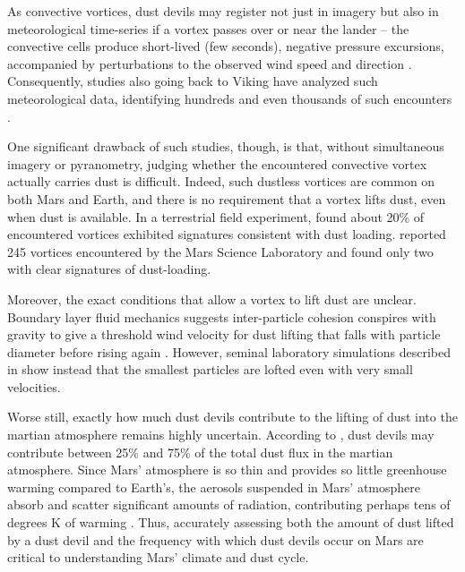 \documentclass{aastex63}
\begin{document}
As convective vortices, dust devils may register not just in imagery but also in meteorological time-series if a vortex passes over or near the lander -- the convective cells produce short-lived (few seconds), negative pressure excursions, accompanied by perturbations to the observed wind speed and direction \citep{2016Icar..271..326L}. Consequently, studies also going back to Viking have analyzed such meteorological data, identifying hundreds and even thousands of such encounters \citep{2003Icar..163...78R, 1999GeoRL..26.2781M, 1983JGR....8811005R, 2003JGRE..108.5133F, 2002GeoRL..29.2103M, 2016SSRv..203..277L}.

One significant drawback of such studies, though, is that, without simultaneous imagery or pyranometry, judging whether the encountered convective vortex actually carries dust is difficult. Indeed, such dustless vortices are common on both Mars and Earth, and there is no requirement that a vortex lifts dust, even when dust is available. In a terrestrial field experiment, \citet{LORENZ20151} found about 20\% of encountered vortices exhibited signatures consistent with dust loading. \citet{2016Icar..278..180S} reported 245 vortices encountered by the Mars Science Laboratory and found only two with clear signatures of dust-loading. 

Moreover, the exact conditions that allow a vortex to lift dust are unclear. Boundary layer fluid mechanics suggests inter-particle cohesion conspires with gravity to give a threshold wind velocity for dust lifting that falls with particle diameter before rising again \citep{1985wagp.book.....G}. However, seminal laboratory simulations described in \citet{2010Icar..206..306N} show instead that the smallest particles are lofted even with very small velocities. 

Worse still, exactly how much dust devils contribute to the lifting of dust into the martian atmosphere remains highly uncertain. According to \citet{2016SSRv..203...89F}, dust devils may contribute between 25\% and 75\% of the total dust flux in the martian atmosphere. Since Mars' atmosphere is so thin and provides so little greenhouse warming compared to Earth's, the aerosols suspended in Mars' atmosphere absorb and scatter significant amounts of radiation, contributing perhaps tens of degrees K of warming \citep{2002Icar..157..259S, 2004JGRE..10911006B}. Thus, accurately assessing both the amount of dust lifted by a dust devil and the frequency with which dust devils occur on Mars are critical to understanding Mars' climate and dust cycle.
\end{document}
